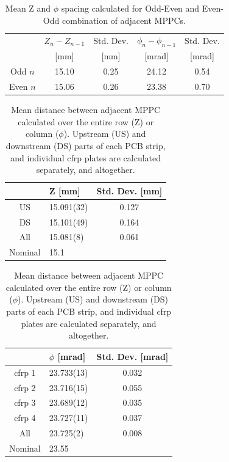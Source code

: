 \begin{table}
\begin{tabular}{ccccc}
 & $Z_{n} - Z_{n-1}$ &Std. Dev.& $\phi_{n} - \phi_{n-1}$ & Std. Dev. \\
 & [mm] &[mm]& [mrad]& [mrad]\\
\hline
Odd  $n$ & 15.10 & 0.25 & 24.12 & 0.54 \\ 
Even $n$ & 15.06 & 0.26 & 23.38 & 0.70 \\ 
\end{tabular}
\caption{Mean Z and $\phi$ spacing calculated for Odd-Even and Even-Odd
combination  of adjacent MPPCs.}
\label{tab:oddeven}
\end{table}

\begin{table}
\begin{tabular}{clc}
   & Z [mm] &Std. Dev. [mm] \\
\hline
US     & 15.091(32)& 0.127  \\
DS     & 15.101(49)& 0.164  \\
All    & 15.081(8) & 0.061  \\
Nominal& 15.1      &
\end{tabular}

\begin{tabular}{clc}
   & $\phi$ [mrad] &Std. Dev. [mrad] \\
\hline
cfrp 1     & 23.733(13)& 0.032  \\
cfrp 2     & 23.716(15)& 0.055  \\
cfrp 3     & 23.689(12)& 0.035  \\
cfrp 4     & 23.727(11)& 0.037  \\
All        & 23.725(2) & 0.008  \\
Nominal    & 23.55 &     
\end{tabular}
\label{tab:avgspacing}
\caption{Mean distance between adjacent MPPC calculated over the entire row (Z) or 
column ($\phi$). Upstream (US) and downstream (DS) parts of each PCB strip, and
individual cfrp plates are calculated separately, and altogether.}
\end{table}

